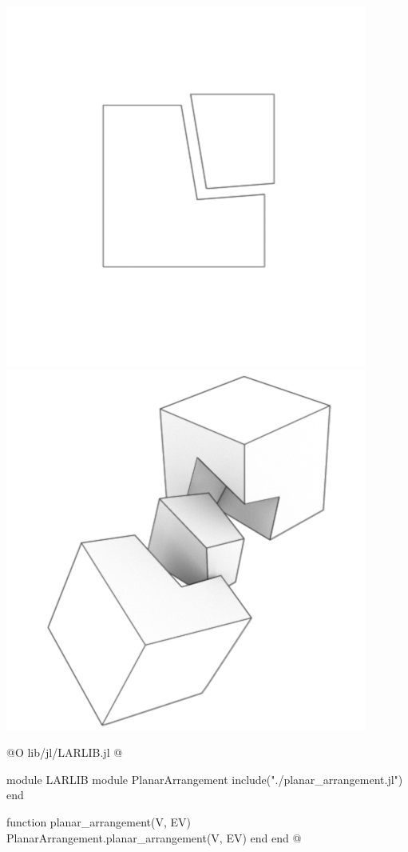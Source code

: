 \includegraphics{./img/ch1-7.png}
\includegraphics{./img/ch1-8.png}


@O lib/jl/LARLIB.jl
@{module LARLIB
    module PlanarArrangement
        include("./planar_arrangement.jl")
    end

    function planar_arrangement(V, EV)
        PlanarArrangement.planar_arrangement(V, EV)
    end
end
@}